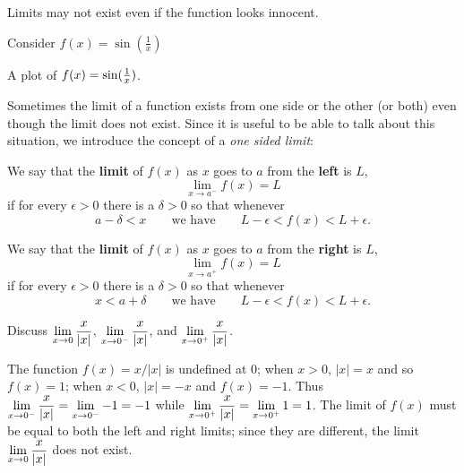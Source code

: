 Limits may not exist even if the function looks innocent. 

\begin{example}
Consider $f(x) = \sin(\frac{1}{x})$
\end{example}
\begin{marginfigure}
\caption{A plot of $f(x)=\protect\sin(\frac{1}{x})$.}
\label{plot:sin 1/x}
\end{marginfigure}

Sometimes the limit of a function exists from one side or the other
(or both) even though the limit does not exist. Since it is useful to
be able to talk about this situation, we introduce the concept of a
\textit{one sided limit}:

\begin{definition} We say that the \textbf{limit} of $f(x)$ as $x$ goes to $a$ from the \textbf{left} is $L$,
\[
\lim_{x\to a^-}f(x)=L
\]
if for every $\epsilon>0$ there is a $\delta > 0$ so that whenever 
\[
a-\delta < x \qquad\text{we have}\qquad L-\epsilon< f(x)<L+\epsilon.
\]

We say that the \textbf{limit} of $f(x)$ as $x$ goes to $a$ from the \textbf{right} is $L$,
\[
\lim_{x\to a^+}f(x)=L
\] 
if for every $\epsilon>0$ there is a $\delta > 0$ so that whenever
\[
x<a+\delta \qquad\text{we have}\qquad L-\epsilon< f(x)<L+\epsilon.
\]
\end{definition}

\begin{example}
Discuss $\displaystyle\lim_{x\to 0}{x\over|x|}$, 
$\displaystyle\lim_{x\to 0^-}{x\over|x|}$,
and $\displaystyle\lim_{x\to 0^+}{x\over|x|}$.

The function $f(x)=x/|x|$ is undefined at 0; when $x>0$, $|x|=x$ and
so $f(x)=1$; when $x<0$, $|x|=-x$ and $f(x)=-1$. Thus
$\displaystyle \lim_{x\to 0^-}{x\over|x|}=\lim_{x\to 0^-}-1=-1$ while 
$\displaystyle \lim_{x\to 0^+}{x\over|x|}=\lim_{x\to 0^+}1=1$. The limit of $f(x)$
must be equal to both the left and right limits; since they are
different, the limit $\displaystyle \lim_{x\to 0}{x\over|x|}$ does not exist.
\end{example}




